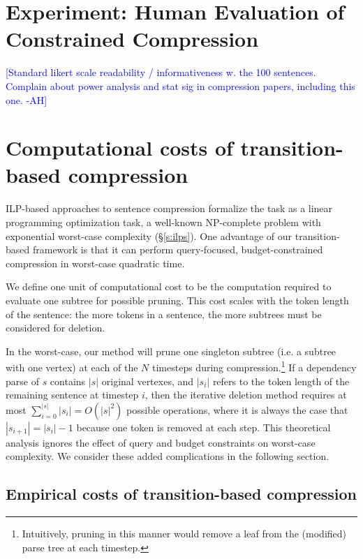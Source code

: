 \documentclass[11pt,a4paper]{article}
\newcommand{\ahcomment}[1]{\textcolor{blue}{[#1 -AH]}}
\begin{document}
\section{Experiment: Human Evaluation of Constrained Compression}\label{s:humaneval}

\ahcomment{Standard likert scale readability / informativeness w. the 100 sentences. Complain about power analysis and stat sig in compression papers, including this one.}

\section{Computational costs of transition-based compression}\label{s:costs}

ILP-based approaches to sentence compression formalize the task as a linear programming optimization task, a well-known NP-complete problem with exponential worst-case complexity (\S\ref{s:ilps}). One advantage of our transition-based framework is that it can perform query-focused, budget-constrained compression in worst-case quadratic time. 

We define one unit of computational cost to be the computation required to evaluate one subtree for possible pruning. This cost scales with the token length of the sentence: the more tokens in a sentence, the more subtrees must be considered for deletion.  %

In the worst-case, our method will prune one singleton subtree (i.e. a subtree with one vertex) at each of the $N$ timesteps during compression.\footnote{Intuitively, pruning in this manner would remove a leaf from the (modified) parse tree at each timestep.} If a dependency parse of $s$ contains $|s|$ original vertexes, and $|s_i|$ refers to the token length of the remaining sentence at timestep $i$, then the iterative deletion method requires at most ${\sum_{i = 0}^{|s|} |s_i | = O(|s|^2)}$ possible operations, where it is always the case that $|s_{i + 1}| = |s_{i}|  - 1$ because one token is removed at each step. This theoretical analysis ignores the effect of query and budget constraints on worst-case complexity. We consider these added complications in the following section.

\subsection{Empirical costs of transition-based compression}\label{s:empiricalcost}
\end{document}
